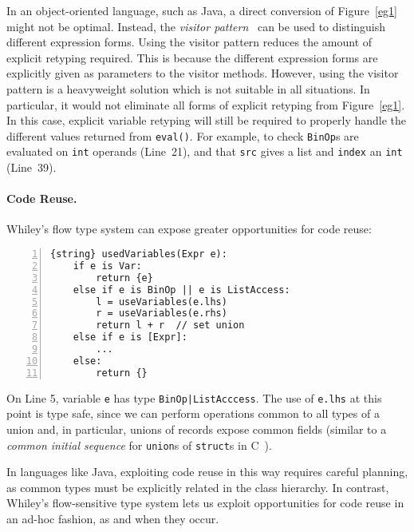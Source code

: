 In an object-oriented language, such as Java, a direct conversion of
Figure~\ref{eg1} might not be optimal.  Instead, the {\em visitor
  pattern}~\cite{gofbook} can be used to distinguish different
expression forms.  Using the visitor pattern reduces the amount of
explicit retyping required.  This is because the different expression
forms are explicitly given as parameters to the visitor methods.
However, using the visitor pattern is a heavyweight solution which is
not suitable in all situations.  In particular, it would not eliminate
all forms of explicit retyping from Figure~\ref{eg1}.  In this case,
explicit variable retyping will still be required to properly handle
the different values returned from \lstinline{eval()}.  For example,
to check \lstinline{BinOp}s are evaluated on \lstinline{int} operands
(Line~21), and that \lstinline{src} gives a list and \lstinline{index}
an \lstinline{int} (Line~39).



\paragraph{Code Reuse.}
Whiley's flow type system can expose greater opportunities
for code reuse:
\begin{lstlisting}[numbers=left]
{string} usedVariables(Expr e):
    if e is Var:
        return {e}
    else if e is BinOp || e is ListAccess:
        l = useVariables(e.lhs)
        r = useVariables(e.rhs)
        return l + r  // set union
    else if e is [Expr]:
        ...
    else:
        return {}
\end{lstlisting}

On Line 5, variable \lstinline{e} has type
\lstinline{BinOp|ListAcccess}.  The use of \lstinline{e.lhs} at this
point is type safe, since we can perform operations common to all
types of a union and, in particular, unions of records expose common
fields (similar to a {\em common initial sequence} for
\lstinline{union}s of \lstinline{struct}s in
C~\cite[\S6.3.2.3]{ISO90}).

In languages like Java, exploiting code reuse in this way requires
careful planning, as common types must be explicitly related in the
class hierarchy.  In contrast, Whiley's flow-sensitive type system
lets us exploit opportunities for code reuse in an ad-hoc fashion, as
and when they occur.

